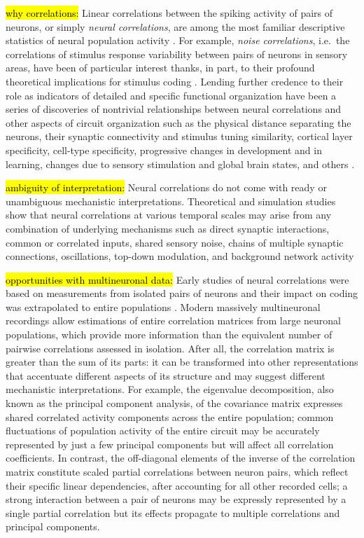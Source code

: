 \hl{\tiny why correlations:}
Linear correlations between the spiking activity of pairs of neurons, or simply \emph{neural correlations}, are among the most familiar descriptive statistics of neural population activity \citep{Cohen:2011}.   
For example, \emph{noise correlations}, i.e.~the correlations of stimulus response variability between pairs of neurons in sensory areas, have been of particular interest thanks, in part, to their profound theoretical implications for stimulus coding \citep{Zohary:1994,Abbott:1999,Averbeck:2006,Berens:2011}.
Lending further credence to their role as indicators of detailed and specific functional organization have been a series of discoveries of nontrivial relationships between neural correlations and other aspects of circuit organization such as the physical distance separating the neurons, their synaptic connectivity and stimulus tuning similarity, cortical layer specificity, cell-type specificity, progressive changes in development and in learning, changes due to sensory stimulation and global brain states, and others \citep{Kohn:2005,Smith:2008,Kohn:2009,Goard:2009,Golshani:2009,Renart:2010,Ecker:2010,Smith:2013,Denman:2013}. 

\hl{\tiny ambiguity of interpretation:}
Neural correlations do not come with ready or unambiguous mechanistic interpretations.   
Theoretical and simulation studies show that neural correlations at various temporal scales may arise from any combination of underlying mechanisms such as direct synaptic interactions,  common or correlated inputs, shared sensory noise, chains of multiple synaptic connections, oscillations, top-down modulation, and background network activity \citep{Perkel:1967b,Shadlen:1998,Salinas:2001,Ostojic:2009,Rosenbaum:2011}

\hl{\tiny opportunities with multineuronal data:}
Early studies of neural correlations were based on measurements from isolated pairs of neurons and their impact on coding was extrapolated to entire populations \citep{Shadlen:1998,Zohary:1994}.  Modern massively multineuronal recordings allow estimations of entire correlation matrices from large neuronal populations, which provide more information than the equivalent number of pairwise correlations assessed in isolation.
After all, the correlation matrix is greater than the sum of its parts: it can be transformed into other representations  that accentuate different aspects of its structure and may suggest different mechanistic interpretations.  
For example, the eigenvalue decomposition, also known as the principal component analysis, of the covariance matrix expresses shared correlated activity components across the entire population;  common fluctuations of population activity of the entire circuit may be accurately represented by just a few principal components but will affect all correlation coefficients. 
In contrast, the off-diagonal elements of the inverse of the correlation matrix constitute scaled partial correlations between neuron pairs, which reflect their specific linear dependencies, after accounting for all other recorded cells;
a strong interaction between a pair of neurons may be expressly represented by a single partial correlation but its effects propagate to multiple correlations and principal components.

